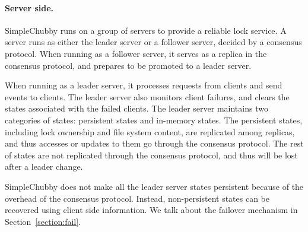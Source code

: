 \paragraph{Server side.}
SimpleChubby runs on a group of servers to provide a reliable lock service.
A server runs as either the leader server or a follower server,
decided by a consensus protocol.
When running as a follower server, it serves as a replica in the consensus
protocol, and prepares to be promoted to a leader server.

When running as a leader server, it processes requests from clients and send
events to clients.
The leader server also monitors client failures, and clears the states associated
with the failed clients.
The leader server maintains two categories of states: persistent states and
in-memory states.
The persistent states, including lock ownership and file system content,
are replicated among replicas, and thus accesses or updates to them go
through the consensus protocol.
The rest of states are not replicated through the consensus protocol,
and thus will be lost after a leader change.

SimpleChubby does not make all the leader server states persistent because
of the overhead of the consensus protocol.
Instead, non-persistent states can be recovered using client side information.
We talk about the failover mechanism in Section~\ref{section:fail}.
